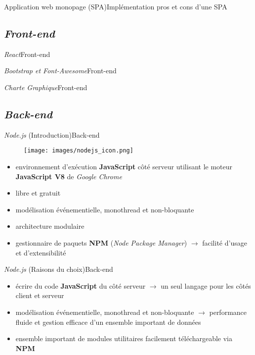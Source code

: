 \documentclass[usenames,dvipsnames]{beamer}
\begin{document}
\begin{frame}{Application web monopage (SPA)}{Implémentation}
pros et cons d'une SPA
\end{frame}

\subsection{\protect\textit{Front-end}}
\begin{frame}{\textit{React}}{Front-end}

\end{frame}

\begin{frame}{\textit{Bootstrap et Font-Awesome}}{Front-end}

\end{frame}

\begin{frame}{\textit{Charte Graphique}}{Front-end}

\end{frame}

\subsection{\protect\textit{Back-end}}
\begin{frame}{\textit{Node.js} (Introduction)}{Back-end}
  \begin{figure}[!ht]
    \texttt{[image: images/nodejs\_icon.png]}
  \end{figure}

  \begin{itemize}
    \item environnement d'exécution \textbf{JavaScript} côté serveur utilisant le moteur \textbf{JavaScript V8} de \textit{Google Chrome}
    \item libre et gratuit
    \item modélisation événementielle, monothread et non-bloquante
    \item architecture modulaire
    \item gestionnaire de paquets \textbf{NPM} (\textit{Node Package Manager}) $\rightarrow$ facilité d'usage et d'extensibilité
  \end{itemize}
\end{frame}

\begin{frame}{\textit{Node.js} (Raisons du choix)}{Back-end}
  \begin{itemize}
    \item écrire du code \textbf{JavaScript} du côté serveur $\rightarrow$ un seul langage pour les côtés client et serveur
    \item modélisation événementielle, monothread et non-bloquante $\rightarrow$ performance fluide et gestion efficace d'un ensemble important de données
    \item ensemble important de modules utilitaires facilement téléchargeable via \textbf{NPM}
  \end{itemize}
\end{frame}
\end{document}
